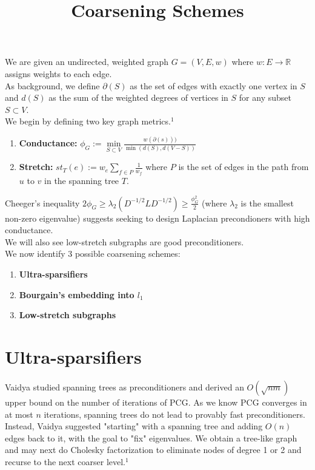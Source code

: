 \documentclass[11pt]{article}
\author{}
\title{}
\begin{document}
\title{Coarsening Schemes}
\maketitle

We are given an undirected, weighted graph $G = (V, E, w)$ where $w: E \to \mathbb{R}$ assigns weights to each edge.\\

As background, we define $\partial(S)$ as the set of edges with exactly one vertex in $S$ and $d(S)$ as the sum of the weighted degrees of vertices in $S$ for any subset $S \subset V$.\\

We begin by defining two key graph metrics.$^1$
\begin{enumerate}
        \item{\bf{Conductance:}} $\phi_G := \min\limits_{S \subset V} \frac{w(\partial (s)))}{\min{(d(S), d(V - S))}}$
        \item{\bf{Stretch:}} $st_T(e) := w_e \sum\limits_{f \in P} \frac{1}{w_f}$ where $P$ is the set of edges in the path from $u$ to $v$ in the spanning tree $T$.
\end{enumerate}

Cheeger's inequality $2 \phi_G \geq \lambda_2 (D^{-1/2}LD^{-1/2}) \geq \frac{\phi_G^2}{2}$ (where $\lambda_2$ is the smallest non-zero eigenvalue) suggests seeking to design Laplacian precondioners with high conductance.\\

We will also see low-stretch subgraphs are good preconditioners.\\

We now identify 3 possible coarsening schemes:
\begin{enumerate}
        \item{\bf{Ultra-sparsifiers}}
        \item{\bf{Bourgain's embedding into $l_1$}}
        \item{\bf{Low-stretch subgraphs}}
\end{enumerate}

\section{Ultra-sparsifiers}
Vaidya studied spanning trees as preconditioners and derived an $O(\sqrt{nm})$ upper bound on the number of iterations of PCG. As we know PCG converges in at most $n$ iterations, spanning trees do not lead to provably fast preconditioners.\\
\newline
Instead, Vaidya suggested "starting" with a spanning tree and adding $O(n)$ edges back to it, with the goal to "fix" eigenvalues. We obtain a tree-like graph and may next do Cholesky factorization to eliminate nodes of degree 1 or 2 and recurse to the next coarser level.$^1$
\end{document}
